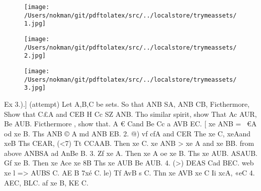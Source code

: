 \documentclass[a4paper,12pt]{article}
\begin{document}
\vspace{10pt}

\par

\vspace{10pt}

\begin{figure}[h]

\texttt{[image: /Users/nokman/git/pdftolatex/src/../localstore/trymeassets/1.jpg]}

\centering

\end{figure}

\par

\vspace{10pt}

\begin{figure}[h]

\texttt{[image: /Users/nokman/git/pdftolatex/src/../localstore/trymeassets/2.jpg]}

\centering

\end{figure}

\par

\vspace{10pt}

\begin{figure}[h]

\texttt{[image: /Users/nokman/git/pdftolatex/src/../localstore/trymeassets/3.jpg]}

\centering

\end{figure}

\par

\vspace{10pt}

    Ex 3.).] (attempt)  Let A,B,C be sets. So that ANB SA, ANB CB,  Ficthermore, Show that C£A and CEB H Cc SZ ANB.    Tho similar spirit, show That Ac AUR, Be AUB.  Ficthermore , show that. A € Cand Be Cc a AVB EC.    [ xe ANB = ~€A od xe B. Ths ANB © A md ANB EB.    2. @) vf cfA and CER The xe C, xeAand xeB Ths CEAR,  (<7) Tt CCAAB. Then xe C. xe ANB > xe A and xe BB. from  above ANBSA ad AnBe B.    3. Zf xe A. Then xe A oe xe B. Ths xe AUB. ASAUB.  Gf xe B. Then xe Ace xe 8B Ths xe AUB Be AUB.    4. (>) DEAS Cad BEC. web xe l    => AUBS C.  AE B 7xé C.    le) Tf AvB s C. Thn xe AVB xe C    Ii xcA, «eC 4. AEC, BLC.  af xe B, KE C. 
\end{document}
